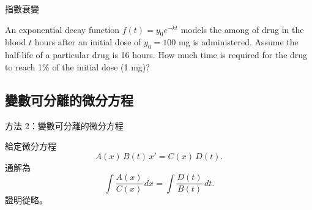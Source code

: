 \documentclass{beamer}
\newcommand  {\e}{\textup e}
\newcommand{\negskip}{\vskip -2em plus 3pt minus 3pt}
\theoremstyle{remark}
\begin{document}
\begin{CJK}{UTF8}{bsmi}
\begin{frame}{指數衰變}
  \begin{example}
    An exponential decay function $f(t) = y_0 e^{-kt}$ models the among of drug in the blood $t$ hours after an initial
    dose of $y_0 = 100$ mg is administered. Assume the half-life of a particular drug is 16 hours. How much time is
    required for the drug to reach 1\% of the initial dose (1 mg)?
  \end{example}
\end{frame}

\subsection[變數可分離]{變數可分離的微分方程}
\begin{frame}{方法 2：變數可分離的微分方程}
  \begin{theorem}
    給定微分方程
    \[A(x)\,B(t)\,x' = C(x)\,D(t).\]
    通解為
    \[\int \frac{A(x)}{C(x)}\,dx = \int \frac{D(t)}{B(t)}\,dt.\]
    證明從略。
  \end{theorem}
\end{frame}


\end{CJK}
\end{document}
